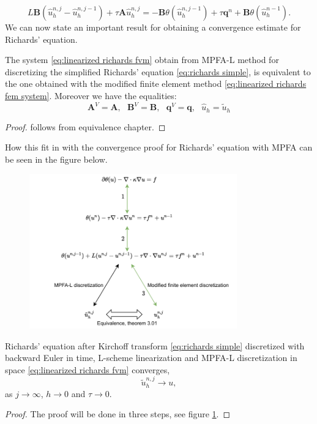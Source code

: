 \documentclass[../Main/main.tex]{subfiles}
\begin{document}
	\begin{equation}\label{eq:linearized richards fem system}
		L\pmb{B}(\hat{u}^{n,j}_h-\hat{u}^{n,j-1}_h) + \tau \pmb{A} \hat{u}_h^{n,j} = -\pmb{B} \theta (\hat{u}_h^{n,j-1})  + \tau \pmb{q}^n +  \pmb{B} \theta (\hat{u}_h^{n-1}).
	\end{equation}
	We can now state an important result for obtaining a convergence estimate for Richards' equation.
	\begin{lemma}
		The system \eqref{eq:linearized richards fvm} obtain from MPFA-L method for discretizing the simplified Richards' equation \eqref{eq:richards simple}, is equivalent to the one obtained with the modified finite element method \eqref{eq:linearized richards fem system}. Moreover we have the equalities: 
		\begin{equation}
			\pmb{A}^V = \pmb{A}, \ \ \ \pmb{B}^V = \pmb{B}, \ \ \ \pmb{q}^V = \pmb{q}, \ \ \ \hat{u}_h = \tilde{u}_h
		\end{equation}
		\begin{proof}
			follows from equivalence chapter.
		\end{proof}
	\end{lemma}
	How this fit in with the convergence proof for Richards' equation with MPFA can be seen in the figure below.
	\begin{figure}[H]
		\centering
		\includegraphics[width=0.8\textwidth]{convergence schema.pdf}
		\label{fig:convergence schema}
	\end{figure}

	
	\begin{theorem}
		Richards' equation after Kirchoff transform \eqref{eq:richards simple} discretized with backward Euler in time, L-scheme linearization and MPFA-L discretization in space \eqref{eq:linearized richards fvm} converges,
		\begin{equation}
			\tilde{u}_h^{n,j}\rightarrow u,
		\end{equation}
		as $j\rightarrow \infty$, $h\rightarrow 0$ and $\tau \rightarrow 0$.
	\end{theorem}
	\begin{proof}
		The proof will be done in three steps, see figure \ref{fig:convergence schema}.
	\end{proof}
	
\end{document}
